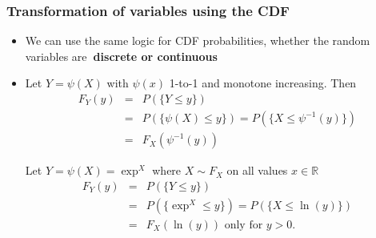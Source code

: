\documentclass[notes=show,smaller,handout]{beamer}
\renewcommand{\Pr}{P}
\newenvironment{stepitemize}{\begin{itemize}[<+->]}{\end{itemize} }
\begin{document}
\begin{frame}%

\frametitle{Transformation of variables using the CDF}

\begin{stepitemize}
\item We can use the same logic for CDF probabilities, whether the random
variables are\textbf{\ discrete or continuous}

\item Let $Y=\psi \left( X\right) $ with $\psi \left( x\right) $ 1-to-1 and
monotone increasing. Then 
\begin{eqnarray*}
F_{Y}\left( y\right) &=&\Pr \left( \{ Y\leq y \}\right) \\
&=&\Pr \left( \{ \psi \left( X\right) \leq y \} \right) =\Pr \left( \{ X\leq \psi
^{-1}\left( y\right) \} \right) \\
&=&F_{X}\left( \psi ^{-1}\left( y\right) \right)
\end{eqnarray*}

\begin{example}
Let $Y=\psi \left( X\right) =\exp^{ X} $ where $%
X\sim F_X$ on all values $x\in 
\mathbb{R}
$%
\begin{eqnarray*}
F_{Y}\left( y\right) &=&\Pr \left( \{ Y\leq y \} \right) \\
&=&\Pr \left( \{ \exp^{  X} \leq y \} \right) =\Pr \left( \{ X\leq \ln
\left( y\right) \} \right) \\
&=&F_{X}\left( \ln \left( y\right) \right) \text{ only for }y>0\text{.}
\end{eqnarray*}
\end{example}

\end{stepitemize}

\end{frame}%
\end{document}
